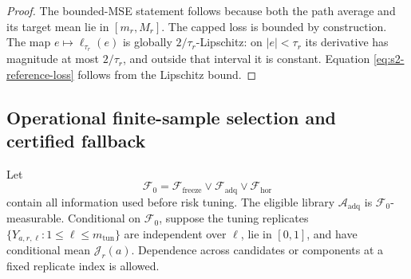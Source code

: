 \begin{proof}
The bounded-MSE statement follows because both the path average and its target
mean lie in \([m_r,M_r]\).  The capped loss is bounded by construction.  The
map \(e\mapsto\ell_{\tau_r}(e)\) is globally \(2/\tau_r\)-Lipschitz: on
\(|e|<\tau_r\) its derivative has magnitude at most \(2/\tau_r\), and outside
that interval it is constant.  Equation \eqref{eq:s2-reference-loss} follows
from the Lipschitz bound.
\end{proof}

\subsection{Operational finite-sample selection and certified fallback}
\label{subsec:stage2-selection}
Let
\[
 \mathcal F_0
 =
 \mathcal F_{\mathrm{freeze}}
 \vee\mathcal F_{\mathrm{adq}}
 \vee\mathcal F_{\mathrm{hor}}
\]
contain all information used before risk tuning.  The eligible library
\(\mathcal A_{\mathrm{adq}}\) is \(\mathcal F_0\)-measurable.  Conditional on
\(\mathcal F_0\), suppose the tuning replicates
\(\{Y_{a,r,\ell}:1\leq\ell\leq m_{\mathrm{tun}}\}\) are independent over
\(\ell\), lie in \([0,1]\), and have conditional mean
\(\mathcal J_r(a)\).  Dependence across candidates or components at a fixed
replicate index is allowed.

